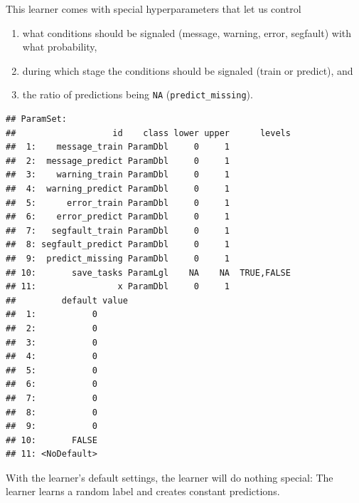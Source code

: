 \documentclass[]{article}
\newenvironment{Shaded}{\begin{snugshade}}{\end{snugshade}}
\newcommand{\KeywordTok}[1]{\textcolor[rgb]{0.13,0.29,0.53}{\textbf{#1}}}
\newcommand{\NormalTok}[1]{#1}
\newcommand{\OperatorTok}[1]{\textcolor[rgb]{0.81,0.36,0.00}{\textbf{#1}}}
\newcommand{\StringTok}[1]{\textcolor[rgb]{0.31,0.60,0.02}{#1}}
\providecommand{\tightlist}{%
  \setlength{\itemsep}{0pt}\setlength{\parskip}{0pt}}
\renewenvironment{Shaded} {\begin{snugshade}\small} {\end{snugshade}}
\begin{document}
This learner comes with special hyperparameters that let us control

\begin{enumerate}
\def\labelenumi{\arabic{enumi}.}
\tightlist
\item
  what conditions should be signaled (message, warning, error, segfault) with what probability,
\item
  during which stage the conditions should be signaled (train or predict), and
\item
  the ratio of predictions being \texttt{NA} (\texttt{predict\_missing}).
\end{enumerate}

\begin{Shaded}
\end{Shaded}

\begin{verbatim}
## ParamSet: 
##                   id    class lower upper      levels
##  1:    message_train ParamDbl     0     1            
##  2:  message_predict ParamDbl     0     1            
##  3:    warning_train ParamDbl     0     1            
##  4:  warning_predict ParamDbl     0     1            
##  5:      error_train ParamDbl     0     1            
##  6:    error_predict ParamDbl     0     1            
##  7:   segfault_train ParamDbl     0     1            
##  8: segfault_predict ParamDbl     0     1            
##  9:  predict_missing ParamDbl     0     1            
## 10:       save_tasks ParamLgl    NA    NA  TRUE,FALSE
## 11:                x ParamDbl     0     1            
##         default value
##  1:           0      
##  2:           0      
##  3:           0      
##  4:           0      
##  5:           0      
##  6:           0      
##  7:           0      
##  8:           0      
##  9:           0      
## 10:       FALSE      
## 11: <NoDefault>
\end{verbatim}

With the learner's default settings, the learner will do nothing special: The learner learns a random label and creates constant predictions.

\begin{Shaded}
\end{Shaded}
\end{document}
